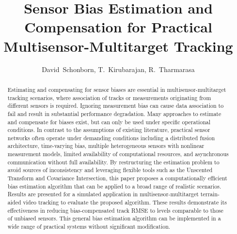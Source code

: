 \documentclass[journal]{IEEEtran}
\begin{document}
\title{Sensor Bias Estimation and Compensation for Practical Multisensor-Multitarget Tracking}
\author{David~Schonborn, T.~Kirubarajan, R.~Tharmarasa}
\maketitle







\begin{abstract}
Estimating and compensating for sensor biases are essential in multisensor-multitarget tracking scenarios, where association of tracks or measurements originating from different sensors is required. Ignoring measurement bias can cause data association to fail and result in substantial performance degradation. Many approaches to estimate and compensate for biases exist, but can only be used under specific operational conditions. In contrast to the assumptions of existing literature, practical sensor networks often operate under demanding conditions including a distributed fusion architecture, time-varying bias, multiple heterogeneous sensors with nonlinear measurement models, limited availability of computational resources, and asynchronous communication without full availability. By restructuring the estimation problem to avoid sources of inconsistency and leveraging flexible tools such as the Unscented Transform and Covariance Intersection, this paper proposes a computationally efficient bias estimation algorithm that can be applied to a broad range of realistic scenarios. Results are presented for a simulated application in multisensor-multitarget terrain-aided video tracking to evaluate the proposed algorithm. These results demonstrate its effectiveness in reducing bias-compensated track RMSE to levels comparable to those of unbiased sensors. This general bias estimation algorithm can be implemented in a wide range of practical systems without significant modification.

\end{abstract}
\IEEEpeerreviewmaketitle
\end{document}
